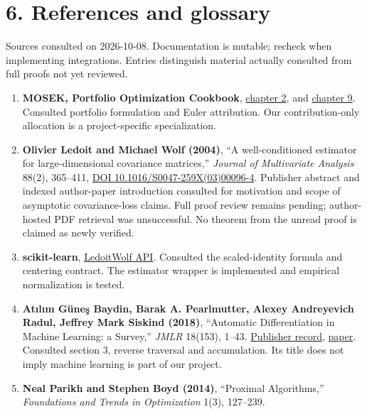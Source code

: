 \documentclass[
  american,
  11pt,
]{article}
\providecommand{\tightlist}{%
  \setlength{\itemsep}{0pt}\setlength{\parskip}{0pt}}
\begin{document}
\section{6. References and glossary}\label{references-and-glossary}

Sources consulted on 2026-10-08. Documentation is mutable; recheck when
implementing integrations. Entries distinguish material actually
consulted from full proofs not yet reviewed.

\begin{enumerate}
\def\labelenumi{\arabic{enumi}.}
\tightlist
\item
  \textbf{MOSEK, Portfolio Optimization Cookbook},
  \href{https://docs.mosek.com/portfolio-cookbook/markowitz.html}{chapter
  2}, and
  \href{https://docs.mosek.com/portfolio-cookbook/risk_parity.html}{chapter
  9}. Consulted portfolio formulation and Euler attribution. Our
  contribution-only allocation is a project-specific specialization.
\item
  \textbf{Olivier Ledoit and Michael Wolf (2004)}, ``A well-conditioned
  estimator for large-dimensional covariance matrices,'' \emph{Journal
  of Multivariate Analysis} 88(2), 365--411,
  \href{https://www.sciencedirect.com/science/article/pii/S0047259X03000964}{DOI
  10.1016/S0047-259X(03)00096-4}. Publisher abstract and indexed
  author-paper introduction consulted for motivation and scope of
  asymptotic covariance-loss claims. Full proof review remains pending;
  author-hosted PDF retrieval was unsuccessful. No theorem from the
  unread proof is claimed as newly verified.
\item
  \textbf{scikit-learn},
  \href{https://scikit-learn.org/stable/modules/generated/sklearn.covariance.LedoitWolf.html}{LedoitWolf
  API}. Consulted the scaled-identity formula and centering contract.
  The estimator wrapper is implemented and empirical normalization is
  tested.
\item
  \textbf{Atılım Güneş Baydin, Barak A. Pearlmutter, Alexey Andreyevich
  Radul, Jeffrey Mark Siskind (2018)}, ``Automatic Differentiation in
  Machine Learning: a Survey,'' \emph{JMLR} 18(153), 1--43.
  \href{https://www.jmlr.org/beta/papers/v18/17-468.html}{Publisher
  record},
  \href{https://jmlr.org/papers/volume18/17-468/17-468.pdf}{paper}.
  Consulted section 3, reverse traversal and accumulation. Its title
  does not imply machine learning is part of our project.
\item
  \textbf{Neal Parikh and Stephen Boyd (2014)}, ``Proximal Algorithms,''
  \emph{Foundations and Trends in Optimization} 1(3), 127--239.

\end{enumerate}
\end{document}
